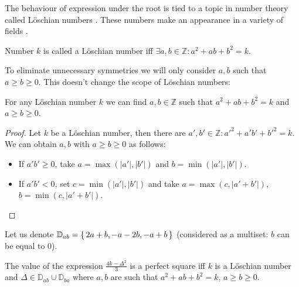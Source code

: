 The behaviour of expression under the root is tied to a topic in number theory called Löschian numbers \cite{marshall1975loschian,oeisA003136}. These numbers make an appearance in a variety of fields \cite{losch1954economics,donovan2016distributive,stannard1995virus}.

\begin{definition}
	\label{v3:def:loeschian}
	Number $k$ is called a Löschian number iff $\exists a,b \in \mathbb Z \colon a^2+ab+b^2=k$.
\end{definition}



To eliminate unnecessary symmetries we will only consider $a,b$ such that $a \geq b \geq 0$. This doesn't change the scope of Löschian numbers:

\begin{lemma}
	\label{v3:lemma:loeschian}
	For any Löschian number $k$ we can find $a,b \in \mathbb Z$ such that $a^2+ab+b^2=k$ and $a \geq b \geq 0$.
\end{lemma}

\begin{proof}
	Let $k$ be a Löschian number, then there are $a',b'\in\mathbb Z\colon a'^2+a'b'+b'^2=k$. We can obtain $a,b$ with $a \geq b \geq 0$ as follows:
	\begin{itemize}
		\item If $a'b' \geq 0$, take $a=\max(|a'|,|b'|)$ and $b=\min(|a'|,|b'|)$.
		\item If $a'b'<0$, set $c = \min(|a'|, |b'|)$ and take $a=\max(c,|a'+b'|)$, $b=\min(c, |a'+b'|)$.
	\end{itemize}
\end{proof}

Let us denote $\mathbb D_{ab} = \set{2a+b, -a-2b, -a+b}$ (considered as a multiset: $b$ can be equal to 0).


\begin{lemma}
	\label{v3:lemma:square}
	The value of the expression $\frac{4k-\Delta^2}{3}$ is a perfect square iff $k$ is a Löschian number and $\Delta\in \mathbb D_{ab} \cup \mathbb D_{ba}$ where $a,b$ are such that $a^2+ab+b^2=k$, $a \geq b \geq 0$.
\end{lemma}

